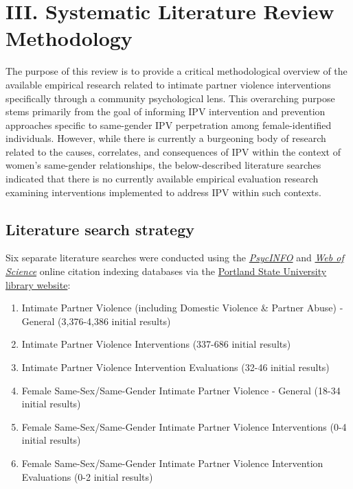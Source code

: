 \documentclass[]{tufte-handout}
\providecommand{\tightlist}{%
  \setlength{\itemsep}{0pt}\setlength{\parskip}{0pt}}
\begin{document}
\section{III. Systematic Literature Review
Methodology}\label{iii.-systematic-literature-review-methodology}

\doublespacing

The purpose of this review is to provide a critical methodological
overview of the available empirical research related to intimate partner
violence interventions specifically through a community psychological
lens. This overarching purpose stems primarily from the goal of
informing IPV intervention and prevention approaches specific to
same-gender IPV perpetration among female-identified individuals.
However, while there is currently a burgeoning body of research related
to the causes, correlates, and consequences of IPV within the context of
women's same-gender relationships, the below-described literature
searches indicated that there is no currently available empirical
evaluation research examining interventions implemented to address IPV
within such contexts.

\subsection{Literature search
strategy}\label{literature-search-strategy}

Six separate literature searches were conducted using the
\href{http://www.apa.org/pubs/databases/psycinfo/}{\emph{PsycINFO}} and
\href{http://wokinfo.com}{\emph{Web of Science}} online citation
indexing databases via the \href{library.pdx.edu}{Portland State
University library website}:

\singlespacing

\begin{enumerate}
\def\labelenumi{\arabic{enumi}.}
\tightlist
\item
  Intimate Partner Violence (including Domestic Violence \& Partner
  Abuse) - General (3,376-4,386 initial results)
\item
  Intimate Partner Violence Interventions (337-686 initial results)
\item
  Intimate Partner Violence Intervention Evaluations (32-46 initial
  results)
\item
  Female Same-Sex/Same-Gender Intimate Partner Violence - General (18-34
  initial results)
\item
  Female Same-Sex/Same-Gender Intimate Partner Violence Interventions
  (0-4 initial results)
\item
  Female Same-Sex/Same-Gender Intimate Partner Violence Intervention
  Evaluations (0-2 initial results)
\end{enumerate}
\end{document}
